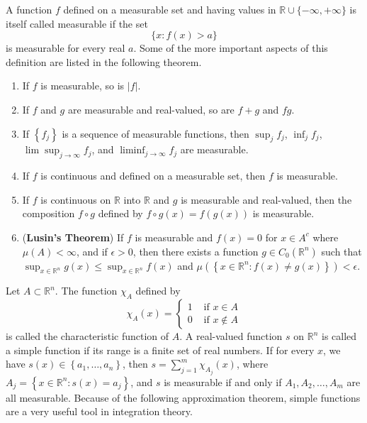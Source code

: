 \begin{para}
  A function $f$ defined on a measurable set and having values in $\mathbb{R} \cup\{-\infty,+\infty\}$ is itself called measurable if the set
  \[
  \{x: f(x)>a\}
  \]
  is measurable for every real $a$. Some of the more important aspects of this definition are listed in the following theorem.
\end{para}


\begin{theorem}
  \begin{enumerate}[label = (\alph*)]
    \item If $f$ is measurable, so is $|f|$.
    \item If $f$ and $g$ are measurable and real-valued, so are $f+g$ and $f g$.
    \item If $\left\{f_j\right\}$ is a sequence of measurable functions,
      then $\sup_j f_j$, $\inf_j f_j$, $\lim \sup_{j \rightarrow \infty} f_j$,
      and $\liminf_{j \rightarrow \infty} f_j$ are measurable.
    \item If $f$ is continuous and defined on a measurable set, then $f$ is measurable.
    \item If $f$ is continuous on $\mathbb{R}$ into $\mathbb{R}$ and $g$ is measurable and 
      real-valued, then the composition $f \circ g$ defined by $f \circ g(x)=f(g(x))$ is 
      measurable.
    \item (\textbf{Lusin's Theorem}) If $f$ is measurable and $f(x)=0$ for $x \in A^c$ 
      where $\mu(A)<\infty$, and if $\epsilon>0$, then there exists a function
      $g \in C_0\left(\mathbb{R}^n\right)$ such that
      $\sup _{x \in \mathbb{R}^n} g(x)\leq \sup_{x \in \mathbb{R}^n} f(x)$
      and $\mu\left(\left\{x \in \mathbb{R}^n: f(x) \neq g(x)\right\}\right)<\epsilon$.
  \end{enumerate}
\end{theorem}

\begin{para}
  Let $A \subset \mathbb{R}^n$. The function $\chi_A$ defined by
  \[
  \chi_A(x)= \begin{cases}1 & \text { if } x \in A \\ 0 & \text { if } x \notin A\end{cases}
  \]
  is called the characteristic function of $A$. A real-valued function $s$ on $\mathbb{R}^n$ is called a simple function if its range is a finite set of real numbers. If for every $x$, we have $s(x) \in\left\{a_1, \ldots, a_n\right\}$, then $s=\sum_{j=1}^m \chi_{A_j}(x)$, where $A_j=\left\{x \in \mathbb{R}^n: s(x)=a_j\right\}$, and $s$ is measurable if and only if $A_1, A_2, \ldots, A_m$ are all measurable. Because of the following approximation theorem, simple functions are a very useful tool in integration theory.
\end{para}

